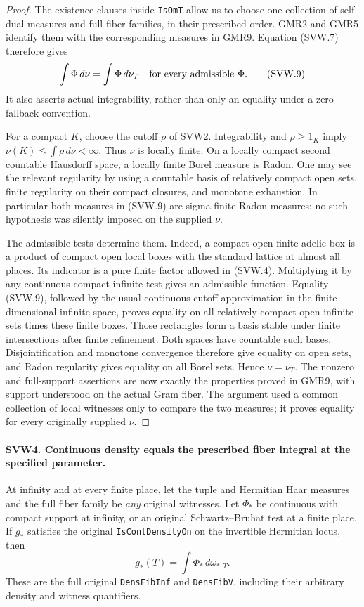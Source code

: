 \begin{proof}
The existence clauses inside \texttt{IsOmT} allow us to choose one
collection of self-dual measures and full fiber families, in their
prescribed order.  GMR2 and GMR5 identify them with the corresponding
measures in GMR9.  Equation (SVW.7) therefore gives
\[
                \int\Phi\,d\nu=\int\Phi\,d\nu_T
          \quad\hbox{for every admissible }\Phi.
 \tag{SVW.9}
\]
It also asserts actual integrability, rather than only an equality
under a zero fallback convention.

For a compact $K$, choose the cutoff $\rho$ of SVW2.  Integrability
and $\rho\geq1_K$ imply
$\nu(K)\leq\int\rho\,d\nu<\infty$.  Thus $\nu$ is locally finite.
On a locally compact second countable Hausdorff space, a locally
finite Borel measure is Radon.  One may see the relevant regularity
by using a countable basis of relatively compact open sets, finite
regularity on their compact closures, and monotone exhaustion.
In particular both measures in (SVW.9) are sigma-finite Radon
measures; no such hypothesis was silently imposed on the supplied
$\nu$.

The admissible tests determine them.  Indeed, a compact open finite
adelic box is a product of compact open local boxes with the
standard lattice at almost all places.  Its indicator is a pure
finite factor allowed in (SVW.4).  Multiplying it by any continuous
compact infinite test gives an admissible function.  Equality
(SVW.9), followed by the usual continuous cutoff approximation in
the finite-dimensional infinite space, proves equality on all
relatively compact open infinite sets times these finite boxes.
Those rectangles form a basis stable under finite intersections
after finite refinement.  Both spaces have countable such bases.
Disjointification and monotone convergence therefore give equality
on open sets, and Radon regularity gives equality on all Borel sets.
Hence $\nu=\nu_T$.  The nonzero and full-support assertions are now
exactly the properties proved in GMR9, with support understood on
the actual Gram fiber.  The argument used a common collection of
local witnesses only to compare the two measures; it proves equality
for every originally supplied $\nu$.
\end{proof}

\paragraph{SVW4. Continuous density equals the prescribed fiber integral at the specified parameter.}
\label{claim:SVW4}
At infinity and at every finite place, let the tuple and Hermitian
Haar measures and the full fiber family be \emph{any} original
witnesses.  Let $\Phi_*$ be continuous with compact support at
infinity, or an original Schwartz--Bruhat test at a finite place.
If $g_*$ satisfies the original \texttt{IsContDensityOn} on the
invertible Hermitian locus, then
\[
                   g_*(T)=\int\Phi_*\,d\omega_{*,T}.
 \tag{SVW.10}
\]
These are the full original \texttt{DensFibInf} and
\texttt{DensFibV}, including their arbitrary density and witness
quantifiers.

